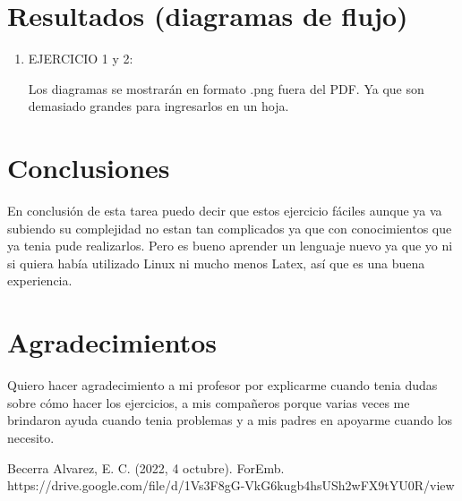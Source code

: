 \documentclass[conference]{IEEEtran}
\begin{document}
\begin{enumerate}
\begin{center}
	\end{center}

\end{enumerate}

\section{Resultados (diagramas de flujo)}
\begin{enumerate}
  	\item EJERCICIO 1 y 2:\\
  	\begin{center}
	Los diagramas se mostrarán en formato .png fuera del PDF. Ya que son demasiado grandes para ingresarlos en un hoja.
	\end{center}

\end{enumerate}

\section{Conclusiones}  
En conclusión de esta tarea puedo decir que estos ejercicio fáciles aunque ya va subiendo su complejidad no estan tan complicados ya que con conocimientos que ya tenia pude realizarlos. Pero es bueno aprender un lenguaje nuevo ya que yo ni si quiera había utilizado Linux ni mucho menos Latex, así que es una buena experiencia.

\section*{Agradecimientos}
Quiero hacer agradecimiento a mi profesor por explicarme cuando tenia dudas sobre cómo hacer los ejercicios, a mis compañeros porque varias veces me brindaron ayuda cuando tenia problemas y a mis padres en apoyarme cuando los necesito.

\begin{thebibliography}{00}
 Becerra Alvarez, E. C. (2022, 4 octubre). ForEmb. https://drive.google.com/file/d/1Vs3F8gG-VkG6kugb4hsUSh2wFX9tYU0R/view
\end{thebibliography}
\end{document}
